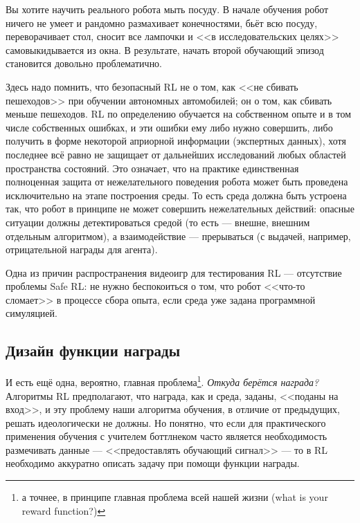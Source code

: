 \begin{example}
Вы хотите научить реального робота мыть посуду. В начале обучения робот ничего не умеет и рандомно размахивает конечностями, бьёт всю посуду, переворачивает стол, сносит все лампочки и <<в исследовательских целях>> самовыкидывается из окна. В результате, начать второй обучающий эпизод становится довольно проблематично.
\end{example}

\begin{remark}
Здесь надо помнить, что безопасный RL не о том, как <<не сбивать пешеходов>> при обучении автономных автомобилей; он о том, как сбивать меньше пешеходов. RL по определению обучается на собственном опыте и в том числе собственных ошибках, и эти ошибки ему либо нужно совершить, либо получить в форме некоторой априорной информации (экспертных данных), хотя последнее всё равно не защищает от дальнейших исследований любых областей пространства состояний. Это означает, что на практике единственная полноценная защита от нежелательного поведения робота может быть проведена исключительно на этапе построения среды. То есть среда должна быть устроена так, что робот в принципе не может совершить нежелательных действий: опасные ситуации должны детектироваться средой (то есть --- внешне, внешним отдельным алгоритмом), а взаимодействие --- прерываться (с выдачей, например, отрицательной награды для агента).
\end{remark}

\begin{remark}
Одна из причин распространения видеоигр для тестирования RL --- отсутствие проблемы Safe RL: не нужно беспокоиться о том, что робот <<что-то сломает>> в процессе сбора опыта, если среда уже задана программной симуляцией.
\end{remark}

\subsection{Дизайн функции награды}

И есть ещё одна, вероятно, главная проблема\footnote{а точнее, в принципе главная проблема всей нашей жизни (what is your reward function?)}. \emph{Откуда берётся награда?} Алгоритмы RL предполагают, что награда, как и среда, заданы, <<поданы на вход>>, и эту проблему наши алгоритма обучения, в отличие от предыдущих, решать идеологически не должны. Но понятно, что если для практического применения обучения с учителем боттлнеком часто является необходимость размечивать данные --- <<предоставлять обучающий сигнал>> --- то в RL необходимо аккуратно описать задачу при помощи функции награды.

